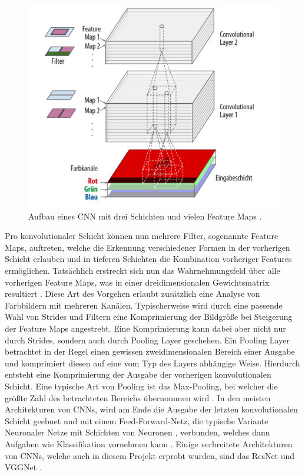 \documentclass[twoside,a4paper]{IEEEtran}
\begin{document}
\begin{figure}[!htb]
	\includegraphics[width=\columnwidth]{cnn_example}
	\caption{Aufbau eines CNN mit drei Schichten und vielen Feature Maps \cite[S.365]{MACHINE_LEARNING}.}
	\label{bild1}
\end{figure}

Pro konvolutionaler Schicht können nun mehrere Filter, sogenannte Feature Maps, auftreten, welche die Erkennung verschiedener Formen in der vorherigen Schicht erlauben und in tieferen Schichten die Kombination vorheriger Features ermöglichen. Tatsächlich erstreckt sich nun das Wahrnehmungsfeld über alle vorherigen Feature Maps, was in einer dreidimensionalen Gewichtsmatrix resultiert \cite[S.364-365]{MACHINE_LEARNING}. Diese Art des Vorgehen erlaubt zusätzlich eine Analyse von Farbbildern mit mehreren Kanälen. Typischerweise wird durch eine passende Wahl von Strides und Filtern eine Komprimierung der Bildgröße bei Steigerung der Feature Maps angestrebt. Eine Komprimierung kann dabei aber nicht nur durch Strides, sondern auch durch Pooling Layer geschehen. Ein Pooling Layer betrachtet in der Regel einen gewissen zweidimensionalen Bereich einer Ausgabe und komprimiert diesen auf eine vom Typ des Layers abhängige Weise. Hierdurch entsteht eine Komprimierung der Ausgabe der vorherigen konvolutionalen Schicht. Eine typische Art von Pooling ist das Max-Pooling, bei welcher die größte Zahl des betrachteten Bereichs übernommen wird \cite[S.369-370]{MACHINE_LEARNING}. In den meisten Architekturen von CNNs, wird am Ende die Ausgabe der letzten konvolutionalen Schicht geebnet und mit einem Feed-Forward-Netz, die typische Variante Neuronaler Netze mit Schichten von Neuronen \cite[S.263]{MACHINE_LEARNING}, verbunden, welches dann Aufgaben wie Klassifikation vornehmen kann \cite[S.371]{MACHINE_LEARNING}. Einige verbreitete Architekturen von CNNs, welche auch in diesem Projekt erprobt wurden, sind das ResNet und VGGNet \cite[S.378-381]{MACHINE_LEARNING}.
\end{document}
